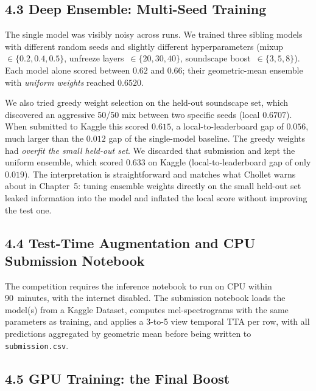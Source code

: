 \documentclass[11pt,a4paper]{article}
\begin{document}
\subsection*{4.3 Deep Ensemble: Multi-Seed Training}

The single model was visibly noisy across runs. We trained three sibling models with different random seeds and slightly different hyperparameters (mixup~$\in\{0.2,0.4,0.5\}$, unfreeze layers~$\in\{20,30,40\}$, soundscape boost~$\in\{3,5,8\}$). Each model alone scored between $0.62$ and $0.66$; their geometric-mean ensemble with \emph{uniform weights} reached $0.6520$.

We also tried greedy weight selection on the held-out soundscape set, which discovered an aggressive 50/50 mix between two specific seeds (local $0.6707$). When submitted to Kaggle this scored $0.615$, a local-to-leaderboard gap of $0.056$, much larger than the $0.012$ gap of the single-model baseline. The greedy weights had \emph{overfit the small held-out set}. We discarded that submission and kept the uniform ensemble, which scored $0.633$ on Kaggle (local-to-leaderboard gap of only $0.019$). The interpretation is straightforward and matches what Chollet warns about in Chapter~5: tuning ensemble weights directly on the small held-out set leaked information into the model and inflated the local score without improving the test one.

\subsection*{4.4 Test-Time Augmentation and CPU Submission Notebook}

The competition requires the inference notebook to run on CPU within 90~minutes, with the internet disabled. The submission notebook loads the model(s) from a Kaggle Dataset, computes mel-spectrograms with the same parameters as training, and applies a 3-to-5 view temporal TTA per row, with all predictions aggregated by geometric mean before being written to \texttt{submission.csv}.

\subsection*{4.5 GPU Training: the Final Boost}
\end{document}
